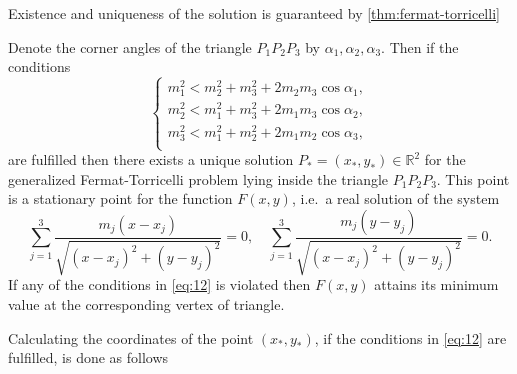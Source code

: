 Existence and uniqueness of the solution is guaranteed by
\cref{thm:fermat-torricelli}
%
\begin{theorem}
\label{thm:fermat-torricelli}
  Denote the corner angles of the triangle $P_1 P_2 P_3$ by $\alpha_1, \alpha_2,
  \alpha_3$. Then if the conditions
  \begin{equation}
    \label{eq:12}
    \left\{
      \begin{array}{c}
        m_1^2 < m_2^2 + m_3^2 + 2 m_2 m_3 \cos \alpha_1 , \\
        m_2^2 < m_1^2 + m_3^2 + 2 m_1 m_3 \cos \alpha_2 , \\
        m_3^2 < m_1^2 + m_2^2 + 2 m_1 m_2 \cos \alpha_3 , \\
      \end{array}
    \right.
  \end{equation}
  are fulfilled then there exists a unique solution $P_\ast = (x_\ast, y_\ast)
  \in \mathbb{R}^2$ for the generalized Fermat-Torricelli problem lying inside
  the triangle $P_1 P_2 P_3$. This point is a stationary point for the function
  $F(x,y)$, i.e.\ a real solution of the system
  \begin{equation}
    \label{eq:13}
    \sum_{j=1}^3 \frac{m_j(x-x_j)}{\sqrt{{(x-x_j)}^2 + {(y - y_j)}^2}} = 0, \quad
    \sum_{j=1}^3 \frac{m_j(y-y_j)}{\sqrt{{(x-x_j)}^2 + {(y - y_j)}^2}} = 0.
  \end{equation}
  If any of the conditions in \cref{eq:12} is violated then $F(x,y)$ attains its
  minimum value at the corresponding vertex of triangle.
\end{theorem}
%
Calculating the coordinates of the point $(x_\ast, y_\ast)$, if the conditions
in \cref{eq:12} are fulfilled, is done as follows
